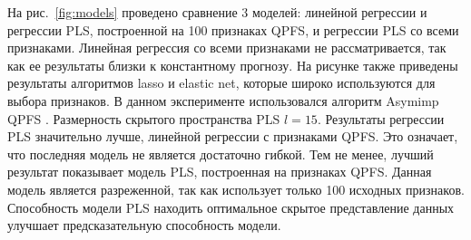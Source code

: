 На рис.~\ref{fig:models} проведено сравнение 3 моделей: линейной регрессии и регрессии PLS, построенной на 100 признаках QPFS, и регрессии PLS со всеми признаками.
Линейная регрессия со всеми признаками не рассматривается, так как ее результаты близки к константному прогнозу. На рисунке также приведены результаты алгоритмов lasso и elastic net, которые широко используются для выбора признаков.
В данном эксперименте использовался алгоритм Asymimp QPFS .
Размерность скрытого пространства PLS $l = 15$.
Результаты регрессии PLS значительно лучше, линейной регрессии с признаками QPFS.
Это означает, что последняя модель не является достаточно гибкой.
Тем не менее, лучший результат показывает модель PLS, построенная на признаках QPFS. 
Данная модель является разреженной, так как использует только 100 исходных признаков.
Способность модели PLS находить оптимальное скрытое представление данных улучшает предсказательную способность модели.

